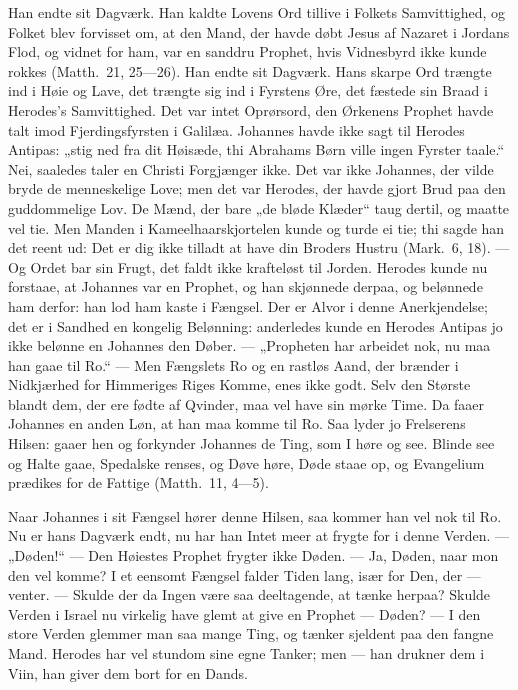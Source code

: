 \documentclass[12pt,a4paper]{book}
\begin{document}
Han endte sit Dagværk. Han kaldte Lovens Ord tillive i Folkets Samvittighed, og
Folket blev forvisset om, at den Mand, der havde døbt Jesus af Nazaret i Jordans
Flod, og vidnet for ham, var en sanddru Prophet, hvis Vidnesbyrd ikke kunde
rokkes (Matth.\ 21, 25---26). Han endte sit Dagværk. Hans skarpe Ord trængte ind
i Høie og Lave, det trængte sig ind i Fyrstens Øre, det fæstede sin Braad i
Herodes's Samvittighed. Det var intet Oprørsord, den Ørkenens Prophet havde talt
imod Fjerdingsfyrsten i Galilæa. Johannes havde ikke sagt til Herodes Antipas:
„stig ned fra dit Høisæde, thi Abrahams Børn ville ingen Fyrster taale.“ Nei,
saaledes taler en Christi Forgjænger
ikke. Det var ikke Johannes, der vilde bryde de menneskelige Love; men det var
Herodes, der havde gjort Brud paa den guddommelige Lov. De Mænd, der bare „de
bløde Klæder“ taug dertil, og maatte vel tie. Men Manden i Kameelhaarskjortelen
kunde og turde ei tie; thi sagde han det reent ud: {\large Det er dig ikke
tilladt at have din Broders Hustru (Mark.\ 6, 18).} --- Og Ordet bar sin Frugt,
det faldt ikke krafteløst til Jorden. Herodes kunde nu forstaae, at Johannes var
en Prophet, og han skjønnede derpaa, og belønnede ham derfor: han lod ham kaste i
Fængsel. Der er Alvor i denne Anerkjendelse; det er i Sandhed en kongelig
Belønning: anderledes kunde en Herodes Antipas jo ikke belønne en Johannes den
Døber. --- „Propheten har arbeidet nok, nu maa han gaae til Ro.“ --- Men
Fængslets Ro og en rastløs Aand, der brænder i Nidkjærhed for Himmeriges Riges
Komme, enes ikke godt. Selv den Største blandt dem, der ere fødte af Qvinder, maa
vel have sin mørke Time. Da faaer Johannes en anden Løn, at han maa komme til Ro.
Saa lyder jo Frelserens Hilsen: {\large gaaer hen og forkynder Johannes de Ting,
som I høre og see. Blinde see og Halte gaae, Spedalske renses, og Døve høre, Døde
staae op, og Evangelium prædikes for de Fattige (Matth.\ 11, 4---5).}

Naar Johannes i sit Fængsel hører denne Hilsen, saa kommer han vel nok til Ro. Nu
er hans Dagværk endt, nu har han Intet meer at frygte for i denne Verden. ---
„Døden!“ --- Den Høiestes Prophet frygter ikke Døden. --- Ja, Døden, naar mon den
vel komme? I et eensomt Fængsel falder Tiden lang, især for Den, der --- venter.
--- Skulde der da Ingen være saa deeltagende, at tænke herpaa? Skulde Verden i
Israel nu virkelig have glemt at give en Prophet --- Døden? --- I den store
Verden glemmer man saa mange Ting, og tænker sjeldent paa den
fangne Mand. Herodes har vel stundom sine egne Tanker; men --- han drukner dem i
Viin, han giver dem bort for en Dands.
\end{document}
